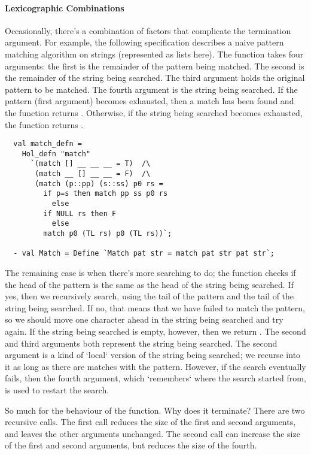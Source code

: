 \paragraph{Lexicographic Combinations}

Occasionally, there's a combination of factors that complicate the
termination argument. For example, the following specification
describes a naive pattern matching algorithm on strings (represented
as lists here). The function takes four arguments: the first is the
remainder of the pattern being matched. The second is the remainder of
the string being searched.  The third argument holds the original
pattern to be matched. The fourth argument is the string being
searched. If the pattern (first argument) becomes exhausted, then a
match has been found and the function returns . Otherwise, if the
string being searched becomes exhausted, the function returns .
%
\setcounter{sessioncount}{0}
\begin{session}
\begin{hol}
\begin{verbatim}
  val match_defn =
    Hol_defn "match"
      `(match [] __ __ __ = T)  /\
       (match __ [] __ __ = F)  /\
       (match (p::pp) (s::ss) p0 rs =
         if p=s then match pp ss p0 rs
           else
         if NULL rs then F
           else
         match p0 (TL rs) p0 (TL rs))`;

  - val Match = Define `Match pat str = match pat str pat str`;
\end{verbatim}
\end{hol}
\end{session}
%
The remaining case is when there's more searching to do; the function
checks if the head of the pattern is the same as the head of the
string being searched. If yes, then we recursively search, using the
tail of the pattern and the tail of the string being searched. If no,
that means that we have failed to match the pattern, so we should move
one character ahead in the string being searched and try again. If the
string being searched is empty, however, then we return \holtxt{F}. The
second and third arguments both represent the string being
searched. The second argument is a kind of `local` version of the
string being searched; we recurse into it as long as there are matches
with the pattern. However, if the search eventually fails, then the
fourth argument, which `remembers` where the search started from, is
used to restart the search.

So much for the behaviour of the function. Why does it terminate? There
are two recursive calls. The first call reduces the size of the first
and second arguments, and leaves the other arguments unchanged. The
second call can increase the size of the first and second arguments, but
reduces the size of the fourth.


